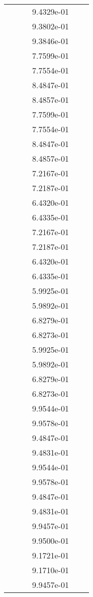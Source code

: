 \begin{xltabular}{\textwidth}{r|rS[table-format=1.3e+2]S[table-format=1.4e+2]S[table-format=1.4e+2]S[table-format=-1.5]}
&  &  & 9.4329e-01 & & \\
&  &  & 9.3802e-01 & & \\
&  &  & 9.3846e-01 & & \\
&  &  & 7.7599e-01 & & \\
&  &  & 7.7554e-01 & & \\
&  &  & 8.4847e-01 & & \\
&  &  & 8.4857e-01 & & \\
&  &  & 7.7599e-01 & & \\
&  &  & 7.7554e-01 & & \\
&  &  & 8.4847e-01 & & \\
&  &  & 8.4857e-01 & & \\
&  &  & 7.2167e-01 & & \\
&  &  & 7.2187e-01 & & \\
&  &  & 6.4320e-01 & & \\
&  &  & 6.4335e-01 & & \\
&  &  & 7.2167e-01 & & \\
&  &  & 7.2187e-01 & & \\
&  &  & 6.4320e-01 & & \\
&  &  & 6.4335e-01 & & \\
&  &  & 5.9925e-01 & & \\
&  &  & 5.9892e-01 & & \\
&  &  & 6.8279e-01 & & \\
&  &  & 6.8273e-01 & & \\
&  &  & 5.9925e-01 & & \\
&  &  & 5.9892e-01 & & \\
&  &  & 6.8279e-01 & & \\
&  &  & 6.8273e-01 & & \\
&  &  & 9.9544e-01 & & \\
&  &  & 9.9578e-01 & & \\
&  &  & 9.4847e-01 & & \\
&  &  & 9.4831e-01 & & \\
&  &  & 9.9544e-01 & & \\
&  &  & 9.9578e-01 & & \\
&  &  & 9.4847e-01 & & \\
&  &  & 9.4831e-01 & & \\
&  &  & 9.9457e-01 & & \\
&  &  & 9.9500e-01 & & \\
&  &  & 9.1721e-01 & & \\
&  &  & 9.1710e-01 & & \\
&  &  & 9.9457e-01 & & \\

\end{xltabular}
